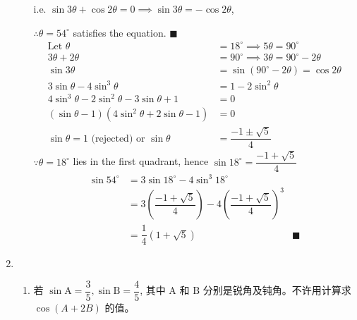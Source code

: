 \documentclass{report}
\begin{document}
\begin{enumerate}[leftmargin=*]
\begin{enumerate}[label=(\roman*)]
            i.e. $\sin 3\theta + \cos 2\theta = 0 \implies \sin 3\theta = -\cos 2\theta$, 
            
            $\therefore \theta = 54^{\circ}$ satisfies the equation. \hfill $\blacksquare$
            \begin{align*}
                \text{Let } \theta &= 18^{\circ} \implies 5\theta = 90^{\circ}\\
                3\theta + 2\theta &= 90^{\circ} \implies 3\theta = 90^{\circ} - 2\theta\\
                \sin 3\theta &= \sin(90^{\circ} - 2\theta) = \cos 2\theta\\
                3\sin\theta - 4\sin^3\theta &= 1 - 2\sin^2\theta\\
                4\sin^3\theta - 2\sin^2\theta - 3\sin\theta + 1 &= 0\\
                (\sin\theta - 1)(4\sin^2\theta + 2\sin\theta - 1) &= 0\\
                \sin\theta = 1 \text{ (rejected)} \text{ or } \sin\theta &= \dfrac{-1 \pm \sqrt{5}}{4}
            \end{align*}
            $\because \theta = 18^{\circ}$ lies in the first quadrant, hence $\sin 18^{\circ} = \dfrac{-1 + \sqrt{5}}{4}$
            \begin{align*}
                \sin 54^{\circ} &= 3\sin 18^{\circ} - 4\sin^3 18^{\circ}\\
                &= 3\left(\dfrac{-1 + \sqrt{5}}{4}\right) - 4\left(\dfrac{-1 + \sqrt{5}}{4}\right)^3\\
                & = \dfrac{1}{4}(1 + \sqrt{5}) & \blacksquare
            \end{align*}
        \end{enumerate}

        \item \begin{enumerate}
            \item 若 $\sin \mathrm{A}=\dfrac{3}{5}, \sin \mathrm{B}=\dfrac{4}{5}$, 其中 $\mathrm{A}$ 和 $\mathrm{B}$ 分别是锐角及钝角。不许用计算求 $\cos (A+2 B)$ 的值。
            

\end{enumerate}
\end{enumerate}
\end{document}
